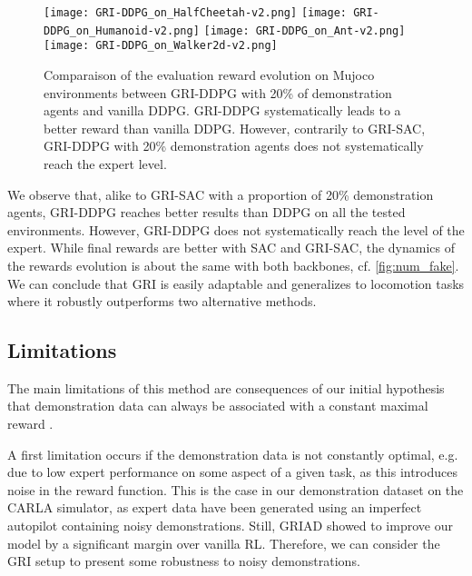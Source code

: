 \documentclass[letterpaper, 10 pt, conference]{ieeeconf}
\begin{document}
\begin{figure*}[t!]
    \centering
    \texttt{[image: GRI-DDPG\_on\_HalfCheetah-v2.png]}
    \texttt{[image: GRI-DDPG\_on\_Humanoid-v2.png]}
    \texttt{[image: GRI-DDPG\_on\_Ant-v2.png]}
    \texttt{[image: GRI-DDPG\_on\_Walker2d-v2.png]}
    \caption{Comparaison of the evaluation reward  evolution on Mujoco environments between  GRI-DDPG with 20\% of demonstration agents and vanilla DDPG. GRI-DDPG systematically leads to a better reward than vanilla DDPG. However, contrarily to GRI-SAC, GRI-DDPG with 20\% demonstration agents does not systematically reach the expert level. }
    \label{fig:xp_ddpgri}
\end{figure*}

\addtolength{\textheight}{+0.062cm}   

We observe that, alike to GRI-SAC with a proportion of 20\% demonstration agents, GRI-DDPG reaches better results than DDPG on all the tested environments. However, GRI-DDPG does not systematically reach the level of the expert. While final rewards are better with SAC and GRI-SAC, the dynamics of the rewards evolution is about the same with both backbones, cf. \cref{fig:num_fake}. We can conclude that GRI is easily adaptable and generalizes to locomotion tasks where it robustly outperforms two alternative methods.


\subsection{Limitations}
\label{sec:limitation}
The main limitations of this method are consequences of our initial hypothesis that demonstration data can always be associated with a constant maximal reward . 

A first limitation occurs if the demonstration data is not constantly optimal, e.g. due to low expert performance on some aspect of a given task, as this introduces noise in the reward function. This is the case in our demonstration dataset on the CARLA simulator, as expert data have been generated using an imperfect autopilot containing  noisy demonstrations. Still, GRIAD showed to improve our model by a significant margin over vanilla RL. Therefore, we can consider the GRI setup to present some robustness to noisy demonstrations.
\end{document}
